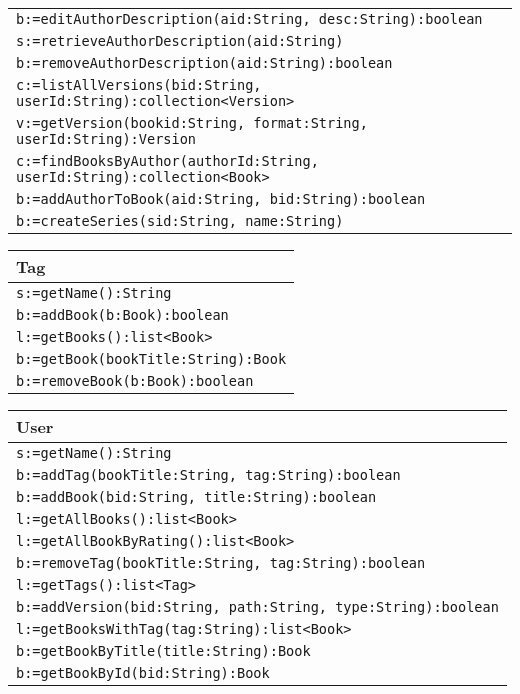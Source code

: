 \documentclass[12pt]{article}
\begin{document}
\begin{tabular}{| l |}
  \texttt{b:=editAuthorDescription(aid:String, desc:String):boolean}\\
  \texttt{s:=retrieveAuthorDescription(aid:String)}\\
  \texttt{b:=removeAuthorDescription(aid:String):boolean}\\
  \texttt{c:=listAllVersions(bid:String, userId:String):collection<Version>}\\
  \texttt{v:=getVersion(bookid:String, format:String, userId:String):Version}\\
  \texttt{c:=findBooksByAuthor(authorId:String, userId:String):collection<Book>}\\
  \texttt{b:=addAuthorToBook(aid:String, bid:String):boolean}\\
  \texttt{b:=createSeries(sid:String, name:String)}\\
    \hline
    
\end{tabular}
\vspace{1cm}

\begin{tabular}{| l |}
    \hline
    Tag\\
    \hline
    \texttt{s:=getName():String}\\
    \texttt{b:=addBook(b:Book):boolean}\\
    \texttt{l:=getBooks():list<Book>}\\
    \texttt{b:=getBook(bookTitle:String):Book}\\
    \texttt{b:=removeBook(b:Book):boolean}\\
    \hline
    
\end{tabular}
\vspace{1cm}

\begin{tabular}{| l |}
    \hline
    User\\
    \hline
    \texttt{s:=getName():String}\\
    \texttt{b:=addTag(bookTitle:String, tag:String):boolean}\\
    \texttt{b:=addBook(bid:String, title:String):boolean}\\
    \texttt{l:=getAllBooks():list<Book>}\\
    \texttt{l:=getAllBookByRating():list<Book>}\\
    \texttt{b:=removeTag(bookTitle:String, tag:String):boolean}\\
    \texttt{l:=getTags():list<Tag>}\\
    \texttt{b:=addVersion(bid:String, path:String, type:String):boolean}\\
    \texttt{l:=getBooksWithTag(tag:String):list<Book>}\\
  \texttt{b:=getBookByTitle(title:String):Book}\\
  \texttt{b:=getBookById(bid:String):Book}\\
    \hline
    
\end{tabular}
\vspace{1cm}
\end{document}
